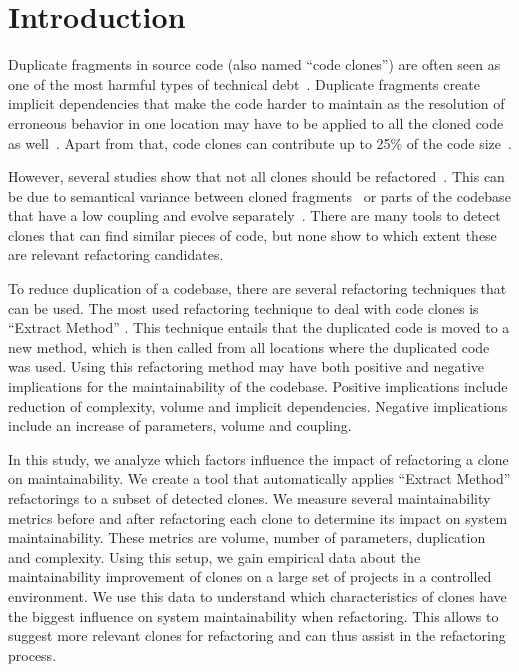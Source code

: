 \documentclass[sigconf,review,anonymous]{acmart}
\begin{document}

\maketitle

\section{Introduction}
Duplicate fragments in source code (also named ``code clones'') are often seen as one of the most harmful types of technical debt~\cite{fowler2018refactoring}. Duplicate fragments create implicit dependencies that make the code harder to maintain as the resolution of erroneous behavior in one location may have to be applied to all the cloned code as well~\cite{ostberg2014automatically, chatterji2013effects}. Apart from that, code clones can contribute up to 25\% of the code size~\cite{bruntink2005use}.

However, several studies show that not all clones should be refactored~\cite{jarzabek2010clones, kapser2008cloning}. This can be due to semantical variance between cloned fragments~\cite{roy2007survey} or parts of the codebase that have a low coupling and evolve separately~\cite{jarzabek2010clones}. There are many tools to detect clones \cite{roy2007survey, sheneamer2016survey, svajlenko2014evaluating, gautam2016various} that can find similar pieces of code, but none show to which extent these are relevant refactoring candidates.

To reduce duplication of a codebase, there are several refactoring techniques that can be used. The most used refactoring technique to deal with code clones is ``Extract Method'' \cite{fowler2018refactoring}. This technique entails that the duplicated code is moved to a new method, which is then called from all locations where the duplicated code was used. Using this refactoring method may have both positive and negative implications for the maintainability of the codebase. Positive implications include reduction of complexity, volume and implicit dependencies. Negative implications include an increase of parameters, volume and coupling. 

In this study, we analyze which factors influence the impact of refactoring a clone on maintainability. We create a tool that automatically applies ``Extract Method'' refactorings to a subset of detected clones. We measure several maintainability metrics \cite{heitlager2007practical} before and after refactoring each clone to determine its impact on system maintainability. These metrics are volume, number of parameters, duplication and complexity. Using this setup, we gain empirical data about the maintainability improvement of clones on a large set of projects in a controlled environment. We use this data to understand which characteristics of clones have the biggest influence on system maintainability when refactoring. This allows to suggest more relevant clones for refactoring and can thus assist in the refactoring process.
\end{document}
